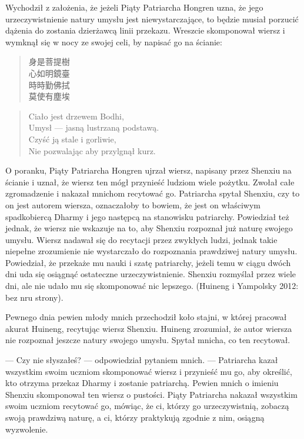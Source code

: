 Wychodził z założenia, że jeżeli Piąty Patriarcha Hongren uzna, że jego urzeczywistnienie natury umysłu jest niewystarczające, to będzie musiał porzucić dążenia do zostania dzierżawcą linii przekazu. Wreszcie skomponował wiersz i wymknął się w nocy ze swojej celi, by napisać go na ścianie:

\vspace*{6pt}
\begin{minipage}[t]{0.4\textwidth}
\begin{verse}
身是菩提樹\\
心如明鏡臺\\
時時勤佛拭\\
莫使有塵埃
\end{verse}
\end{minipage}
\begin{minipage}[t]{0.6\textwidth}
\itshape
\begin{verse}
Ciało jest drzewem Bodhi,\\
Umysł --- jasną lustrzaną podstawą.\\
Czyść ją stale i gorliwie,\\
Nie pozwalając aby przylgnął kurz. 
\end{verse}
\end{minipage}
\vspace*{6pt}

O poranku, Piąty Patriarcha Hongren ujrzał wiersz, napisany przez Shenxiu na ścianie i uznał, że wiersz ten mógł przynieść ludziom wiele pożytku. Zwołał całe zgromadzenie i nakazał mnichom recytować go. Patriarcha spytał Shenxiu, czy to on jest autorem wiersza, oznaczałoby to bowiem, że jest on właściwym spadkobiercą Dharmy i jego następcą na stanowisku patriarchy. Powiedział też jednak, że wiersz nie wskazuje na to, aby Shenxiu rozpoznał już naturę swojego umysłu. Wiersz nadawał się do recytacji przez zwykłych ludzi, jednak takie niepełne zrozumienie nie wystarczało do rozpoznania prawdziwej natury umysłu. Powiedział, że przekaże mu nauki i szatę patriarchy, jeżeli temu w ciągu dwóch dni uda się osiągnąć ostateczne urzeczywistnienie. Shenxiu rozmyślał przez wiele dni, ale nie udało mu się skomponować nic lepszego. (Huineng i Yampolsky 2012: bez nru strony).

Pewnego dnia pewien młody mnich przechodził koło stajni, w której pracował akurat Huineng, recytując wiersz Shenxiu. Huineng zrozumiał, że autor wiersza nie rozpoznał jeszcze natury swojego umysłu. Spytał mnicha, co ten recytował.

--- Czy nie słyszałeś? --- odpowiedział pytaniem mnich. --- Patriarcha kazał wszystkim swoim uczniom skomponować wiersz i przynieść mu go, aby określić, kto otrzyma przekaz Dharmy i zostanie patriarchą. Pewien mnich o imieniu Shenxiu skomponował ten wiersz o pustości. Piąty Patriarcha nakazał wszystkim swoim uczniom recytować go, mówiąc, że ci, którzy go urzeczywistnią, zobaczą swoją prawdziwą naturę, a ci, którzy praktykują zgodnie z nim, osiągną wyzwolenie.

